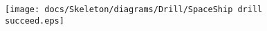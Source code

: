 \begin{figure}[H] 
\centering 
\texttt{[image: docs/Skeleton/diagrams/Drill/SpaceShip drill succeed.eps]} 
\caption{} 
\end{figure} 
